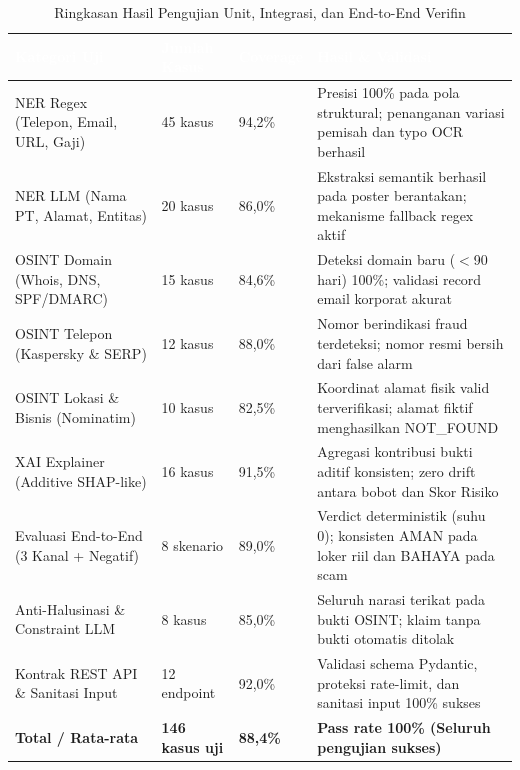 \documentclass[12pt,a4paper]{article}
\newcommand{\thead}[1]{\textcolor{white}{\textbf{#1}}}
\begin{document}
\begin{adjustwidth}{0.50cm}{0pt}
\begin{table}[H]
\centering
\caption{Ringkasan Hasil Pengujian Unit, Integrasi, dan End-to-End Verifin}
\label{tab:test-results}
\small
\begin{tabularx}{\linewidth}{@{}L{3.2cm}C{1.8cm}C{2.0cm}Y@{}}
\toprule
{}\thead{Kategori Uji} & \thead{Jumlah Kasus} & \thead{Coverage} & \thead{Hasil \& Validasi} \\
\midrule
{}
NER Regex (Telepon, Email, URL, Gaji) & 45 kasus & 94,2\% & Presisi 100\% pada pola struktural; penanganan variasi pemisah dan typo OCR berhasil \\
NER LLM (Nama PT, Alamat, Entitas) & 20 kasus & 86,0\% & Ekstraksi semantik berhasil pada poster berantakan; mekanisme fallback regex aktif \\
OSINT Domain (Whois, DNS, SPF/DMARC) & 15 kasus & 84,6\% & Deteksi domain baru ($<$90 hari) 100\%; validasi record email korporat akurat \\
OSINT Telepon (Kaspersky \& SERP) & 12 kasus & 88,0\% & Nomor berindikasi fraud terdeteksi; nomor resmi bersih dari false alarm \\
OSINT Lokasi \& Bisnis (Nominatim) & 10 kasus & 82,5\% & Koordinat alamat fisik valid terverifikasi; alamat fiktif menghasilkan NOT\_FOUND \\
XAI Explainer (Additive SHAP-like) & 16 kasus & 91,5\% & Agregasi kontribusi bukti aditif konsisten; zero drift antara bobot dan Skor Risiko \\
Evaluasi End-to-End (3 Kanal + Negatif) & 8 skenario & 89,0\% & Verdict deterministik (suhu 0); konsisten AMAN pada loker riil dan BAHAYA pada scam \\
Anti-Halusinasi \& Constraint LLM & 8 kasus & 85,0\% & Seluruh narasi terikat pada bukti OSINT; klaim tanpa bukti otomatis ditolak \\
Kontrak REST API \& Sanitasi Input & 12 endpoint & 92,0\% & Validasi schema Pydantic, proteksi rate-limit, dan sanitasi input 100\% sukses \\
\midrule
\textbf{Total / Rata-rata} & \textbf{146 kasus uji} & \textbf{88,4\%} & \textbf{Pass rate 100\% (Seluruh pengujian sukses)} \\
\bottomrule
\end{tabularx}
\end{table}
\end{adjustwidth}
\end{document}
